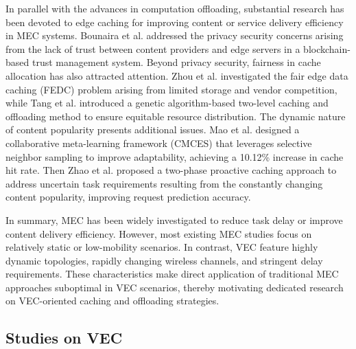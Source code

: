 \documentclass[lettersize,journal]{IEEEtran}
\begin{document}
In parallel with the advances in computation offloading, substantial research has been devoted to edge caching for improving content or service delivery efficiency in MEC systems.
% 
Bounaira et al. \cite{BounairaAlioua-30} addressed the privacy security concerns arising from the lack of trust  between content providers and edge servers in a blockchain-based trust management system.
% 
Beyond privacy security, fairness in cache allocation has also attracted attention. Zhou et al. \cite{ZhouChen-31} investigated the fair edge data caching (FEDC) problem arising from limited storage and vendor competition, while Tang et al. \cite{Tang} introduced a genetic algorithm-based two-level caching and offloading method to ensure equitable resource distribution.
% 
The dynamic nature of content popularity presents additional issues. Mao et al. \cite{MaoHe-32} designed a collaborative meta-learning framework (CMCES) that leverages selective neighbor sampling to improve adaptability, achieving a 10.12\% increase in cache hit rate.
%
Then Zhao et al. \cite{ZhaoNakhai-33} proposed a two-phase proactive caching approach to address uncertain task requirements resulting from the constantly changing content popularity,  improving request prediction accuracy.
%

In summary, MEC has been widely investigated to reduce task delay or improve content delivery efficiency. However, most existing MEC studies focus on relatively static or low-mobility scenarios. In contrast, VEC feature highly dynamic topologies, rapidly changing wireless channels, and stringent delay requirements. These characteristics make direct application of traditional MEC approaches suboptimal in VEC scenarios, thereby motivating dedicated research on VEC-oriented caching and offloading strategies.


\subsection{Studies on VEC}
\end{document}
